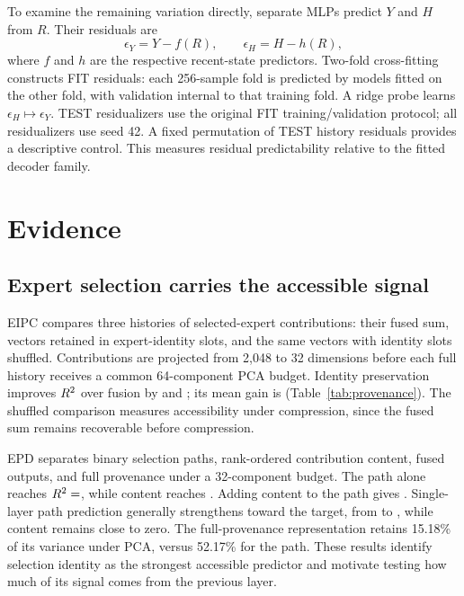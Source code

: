\documentclass[10pt,letterpaper,twocolumn]{yalearxiv}
\begin{document}


To examine the remaining variation directly, separate MLPs predict $Y$ and $H$ from $R$. Their residuals are
\begin{equation}
\epsilon_Y=Y-f(R),\qquad \epsilon_H=H-h(R),
\end{equation}
where $f$ and $h$ are the respective recent-state predictors. Two-fold cross-fitting constructs FIT residuals: each 256-sample fold is predicted by models fitted on the other fold, with validation internal to that training fold. A ridge probe learns $\epsilon_H\mapsto\epsilon_Y$. TEST residualizers use the original FIT training/validation protocol; all residualizers use seed 42. A fixed permutation of TEST history residuals provides a descriptive control. This measures residual predictability relative to the fitted decoder family.

\section{Evidence}
\subsection{Expert selection carries the accessible signal}
EIPC compares three histories of selected-expert contributions: their fused sum, vectors retained in expert-identity slots, and the same vectors with identity slots shuffled. Contributions are projected from 2,048 to 32 dimensions before each full history receives a common 64-component PCA budget. Identity preservation improves $R^2$ over fusion by  and ; its mean gain is  (Table~\ref{tab:provenance}). The shuffled comparison measures accessibility under compression, since the fused sum remains recoverable before compression.

EPD separates binary selection paths, rank-ordered contribution content, fused outputs, and full provenance under a 32-component budget. The path alone reaches $\rsq=\metric{EpdId}$, while content reaches . Adding content to the path gives . Single-layer path prediction generally strengthens toward the target, from  to , while content remains close to zero. The full-provenance representation retains 15.18\% of its variance under PCA, versus 52.17\% for the path. These results identify selection identity as the strongest accessible predictor and motivate testing how much of its signal comes from the previous layer.
\end{document}
